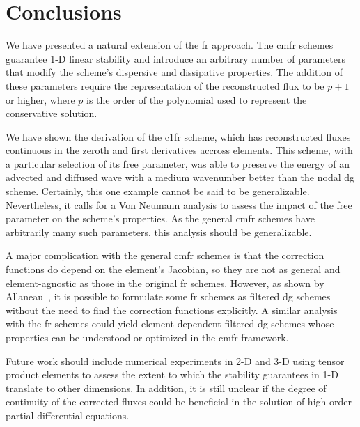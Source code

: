 \section{Conclusions}

We have presented a natural extension of the \gls{fr} approach. The \gls{cmfr} schemes guarantee 1-D linear stability and introduce an arbitrary number of parameters that modify the scheme's dispersive and dissipative properties. The addition of these parameters require the representation of the reconstructed flux to be $p+1$ or higher, where $p$ is the order of the polynomial used to represent the conservative solution.

 We have shown the derivation of the \gls{c1fr} scheme, which has reconstructed fluxes continuous in the zeroth and first derivatives accross elements. This scheme, with a particular selection of its free parameter, was able to preserve the energy of an advected and diffused wave with a medium wavenumber better than the nodal \gls{dg} scheme. Certainly, this one example cannot be said to be generalizable. Nevertheless, it calls for a Von Neumann analysis to assess the impact of the free parameter on the scheme's properties. As the general \gls{cmfr} schemes have arbitrarily many such parameters, this analysis should be generalizable.

A major complication with the general \gls{cmfr} schemes is that the correction functions do depend on the element's Jacobian, so they are not as general and element-agnostic as those in the original \gls{fr} schemes. However, as shown by Allaneau~\cite{allaneau2011connections}, it is possible to formulate some \gls{fr} schemes as filtered \gls{dg} schemes without the need to find the correction functions explicitly. A similar analysis with the \gls{fr} schemes could yield element-dependent filtered \gls{dg} schemes whose properties can be understood or optimized in the \gls{cmfr} framework.

Future work should include numerical experiments in 2-D and 3-D using tensor product elements to assess the extent to which the stability guarantees in 1-D translate to other dimensions. In addition, it is still unclear if the degree of continuity of the corrected fluxes could be beneficial in the solution of high order partial differential equations.